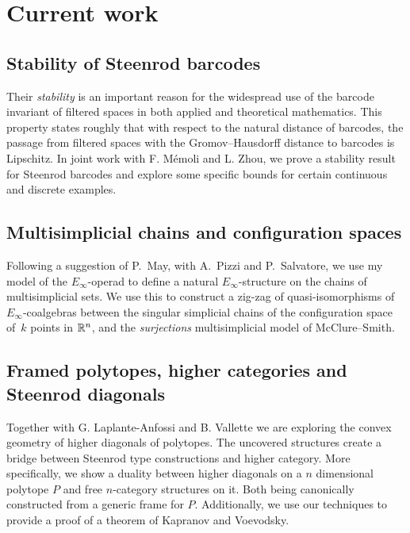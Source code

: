 
\section{Current work} \label{s:current}

\subsection{Stability of Steenrod barcodes}

Their \textit{stability} is an important reason for the widespread use of the barcode invariant of filtered spaces in both applied and theoretical mathematics.
This property states roughly that with respect to the natural distance of barcodes, the passage from filtered spaces with the Gromov--Hausdorff distance to barcodes is Lipschitz.
In joint work with F. M\'emoli and L. Zhou, we prove a stability result for Steenrod barcodes and explore some specific bounds for certain continuous and discrete examples.

\subsection{Multisimplicial chains and configuration spaces}

Following a suggestion of P.~May, with A.~Pizzi and P.~Salvatore, we use my model of the $E_\infty$-operad to define a natural $E_\infty$-structure on the chains of multisimplicial sets.
We use this to construct a zig-zag of quasi-isomorphisms of $E_\infty$-coalgebras between the singular simplicial chains of the configuration space of~$k$ points in $\mathbb{R}^n$, and the \textit{surjections} multisimplicial model of McClure--Smith.

\subsection{Framed polytopes, higher categories and Steenrod diagonals} \label{ss:polytopes}

Together with G. Laplante-Anfossi and B. Vallette we are exploring the convex geometry of higher diagonals of polytopes.
The uncovered structures create a bridge between Steenrod type constructions and higher category.
More specifically, we show a duality between higher diagonals on a $n$ dimensional polytope $P$ and free $n$-category structures on it.
Both being canonically constructed from a generic frame for $P$.
Additionally, we use our techniques to provide a proof of a theorem of Kapranov and Voevodsky.

